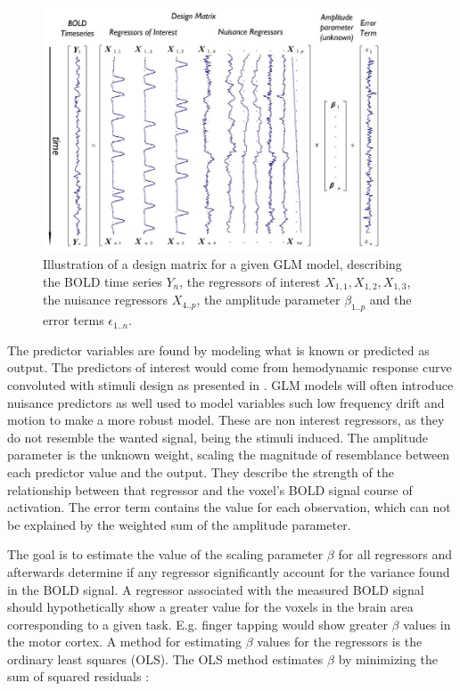 \begin{figure}[H] 
	\includegraphics[width=0.90\textwidth]{figures/aBackground/GLM}
	\caption{Illustration of a design matrix for a given GLM model, describing the BOLD time series $Y_n$, the regressors of interest $X_{1,1}, X_{1,2}, X_{1,3}$, the nuisance regressors $X_{4..p}$, the amplitude parameter $\beta_{1..p}$ and the error terms $\epsilon_{1..n}$. \cite{Monti2011}}
	\label{fig:GLM}
\end{figure}



The predictor variables are found by modeling what is known or predicted as output. The predictors of interest would come from hemodynamic response curve convoluted with stimuli design as presented in . GLM models will often introduce nuisance predictors as well used to model variables such low frequency drift and motion to make a more robust model. These are non interest regressors, as they do not resemble the wanted signal, being the stimuli induced. The amplitude parameter is the unknown weight, scaling the magnitude of resemblance between each predictor value and the output. They describe the strength of the relationship between that regressor and the voxel's BOLD signal course of activation. The error term contains the value for each observation, which can not be explained by the weighted sum of the amplitude parameter. \cite{Moayedi2018,Monti2011} 

The goal is to estimate the value of the scaling parameter $\beta$ for all regressors and afterwards determine if any regressor significantly account for the variance found in the BOLD signal. A regressor associated with the measured BOLD signal should hypothetically show a greater value for the voxels in the brain area corresponding to a given task. E.g. finger tapping would show greater $\beta$ values in the motor cortex. A method for estimating $\beta$ values for the regressors is the ordinary least squares (OLS). The OLS method estimates $\beta$ by minimizing the sum of squared residuals \cite{Monti2011}: 

